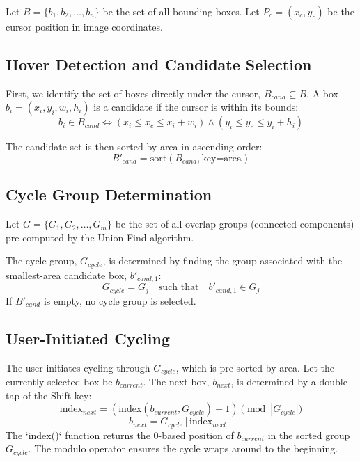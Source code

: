 \documentclass[10pt]{article}
\begin{document}
Let $B = \{b_1, b_2, \ldots, b_n\}$ be the set of all bounding boxes.
Let $P_c = (x_c, y_c)$ be the cursor position in image coordinates.

\subsection{Hover Detection and Candidate Selection}
First, we identify the set of boxes directly under the cursor, $B_{cand} \subseteq B$. A box $b_i = (x_i, y_i, w_i, h_i)$ is a candidate if the cursor is within its bounds:
\begin{equation}
    b_i \in B_{cand} \iff (x_i \le x_c \le x_i + w_i) \land (y_i \le y_c \le y_i + h_i)
\end{equation}

The candidate set is then sorted by area in ascending order:
\begin{equation}
    B'_{cand} = \text{sort}(B_{cand}, \text{key=area})
\end{equation}

\subsection{Cycle Group Determination}
Let $G = \{G_1, G_2, \ldots, G_m\}$ be the set of all overlap groups (connected components) pre-computed by the Union-Find algorithm.

The cycle group, $G_{cycle}$, is determined by finding the group associated with the smallest-area candidate box, $b'_{cand,1}$:
\begin{equation}
    G_{cycle} = G_j \quad \text{such that} \quad b'_{cand,1} \in G_j
\end{equation}
If $B'_{cand}$ is empty, no cycle group is selected.

\subsection{User-Initiated Cycling}
The user initiates cycling through $G_{cycle}$, which is pre-sorted by area. Let the currently selected box be $b_{current}$. The next box, $b_{next}$, is determined by a double-tap of the Shift key:
\begin{equation}
    \text{index}_{next} = (\text{index}(b_{current}, G_{cycle}) + 1) \pmod{|G_{cycle}|}
\end{equation}
\begin{equation}
    b_{next} = G_{cycle}[\text{index}_{next}]
\end{equation}
The `index()` function returns the 0-based position of $b_{current}$ in the sorted group $G_{cycle}$. The modulo operator ensures the cycle wraps around to the beginning.
\end{document}

